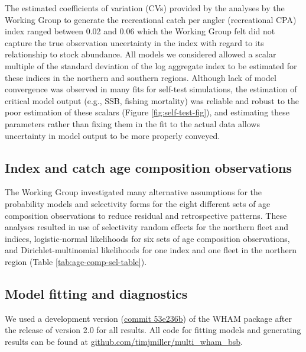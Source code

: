 \documentclass[
]{article}
\begin{document}
The estimated coefficients of variation (CVs) provided by the analyses by the Working Group to generate the recreational catch per angler (recreational CPA) index ranged between 0.02 and 0.06 which the Working Group felt did not capture the true observation uncertainty in the index with regard to its relationship to stock abundance. All models we considered allowed a scalar multiple of the standard deviation of the log aggregate index to be estimated for these indices in the northern and southern regions. Although lack of model convergence was observed in many fits for self-test simulations, the estimation of critical model output (e.g., SSB, fishing mortality) was reliable and robust to the poor estimation of these scalars (Figure \ref{fig:self-test-fig}), and estimating these parameters rather than fixing them in the fit to the actual data allows uncertainty in model output to be more properly conveyed.

\hypertarget{index-and-catch-age-composition-observations}{%
\subsection*{Index and catch age composition observations}\label{index-and-catch-age-composition-observations}}

The Working Group investigated many alternative assumptions for the probability models and selectivity forms for the eight different sets of age composition observations to reduce residual and retrospective patterns. These analyses resulted in use of selectivity random effects for the northern fleet and indices, logistic-normal likelihoods for six sets of age composition observations, and Dirichlet-multinomial likelihoods for one index and one fleet in the northern region (Table \ref{tab:age-comp-sel-table}).

\hypertarget{model-fitting-and-diagnostics}{%
\subsection*{Model fitting and diagnostics}\label{model-fitting-and-diagnostics}}

We used a development version (\href{https://github.com/timjmiller/wham/tree/53e236b}{commit 53e236b}) of the WHAM package after the release of version 2.0 for all results. All code for fitting models and generating results can be found at \href{https://github.com/timjmiller/multi_wham_bsb}{github.com/timjmiller/multi\_wham\_bsb}.
\end{document}
